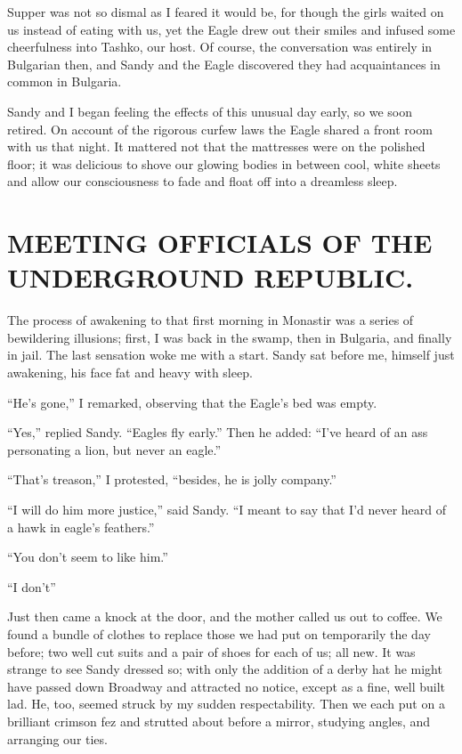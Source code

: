 \documentclass[a5paper,12pt]{book}
\begin{document}
Supper was not so dismal as I feared it would be, for though the girls waited on us instead of eating with us, yet the Eagle drew out their smiles and infused some cheerfulness into Tashko, our host. Of course, the conversation was entirely in Bulgarian then, and Sandy and the Eagle discovered they had acquaintances in common in Bulgaria. 

Sandy and I began feeling the effects of this unusual day early, so we soon retired. On account of the rigorous curfew laws the Eagle shared a front room with us that night. It mattered not that the mattresses were on the polished floor; it was delicious to shove our glowing bodies in between cool, white sheets and allow our consciousness to fade and float off into a dreamless sleep. 


\chapter{MEETING OFFICIALS OF THE UNDERGROUND REPUBLIC.}

The process of awakening to that first morning in Monastir was a series of bewildering illusions; first, I was back in the swamp, then in Bulgaria, and finally in jail. The last sensation woke me with a start. Sandy sat before me, himself just awakening, his face fat and heavy with sleep. 

“He’s gone,” I remarked, observing that the Eagle’s bed was empty. 

“Yes,” replied Sandy. “Eagles fly early.” Then he added: “I’ve heard of an ass personating a lion, but never an eagle.” 

“That’s treason,” I protested, “besides, he is jolly company.” 

“I will do him more justice,” said Sandy. “I meant to say that I’d never heard of a hawk in eagle’s feathers.” 

“You don’t seem to like him.” 

“I don’t” 

Just then came a knock at the door, and the mother called us out to coffee. We found a bundle of clothes to replace those we had put on temporarily the day before; two well cut suits and a pair of shoes for each of us; all new. It was strange to see Sandy dressed so; with only the addition of a derby hat he might have passed down Broadway and attracted no notice, except as a fine, well built lad. He, too, seemed struck by my sudden respectability. Then we each put on a brilliant crimson fez and strutted about before a mirror, studying angles, and arranging our ties. 
\end{document}

